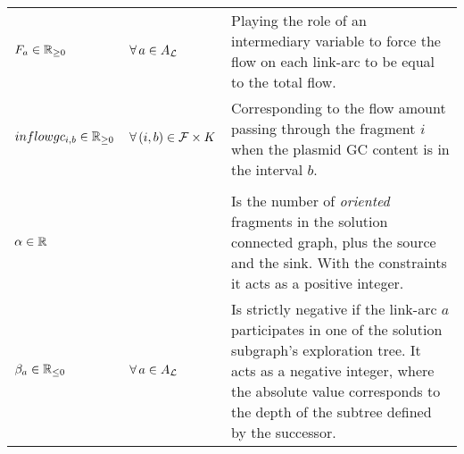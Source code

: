 \begin{table}
\begin{longtable}{@{}llp{}@{}}
    \addlinespace
    \(F_a \in \mathbb{R}_{\geq 0}\) & \(\forall a \in A_\Links{}\) & Playing the role of an intermediary variable to force the flow on each link-arc to be equal to the total flow. \\
    \addlinespace
    \(inflowgc_{i, b} \in \mathbb{R}_{\geq 0}\) & \(\forall (i, b) \in \Fragments{} \times K\) & Corresponding to the flow amount passing through the fragment \(i\) when the plasmid GC content is in the interval \(b\). \\
    \addlinespace
    \multicolumn{3}{@{}l@{}}{\tabhtxt{Connected component variables}} \\
    \addlinespace
    \(\alpha \in \mathbb{R}{}\) & & Is the number of \emph{oriented} fragments in the solution connected graph, plus the source and the sink. With the constraints it acts as a positive integer. \\
    \addlinespace
    \(\beta_a \in \mathbb{R}_{\leq 0}\) & \(\forall a \in A_\Links{}\) & Is strictly negative if the link-arc \(a\) participates in one of the solution subgraph's exploration tree. It acts as a negative integer, where the absolute value corresponds to the depth of the subtree defined by the successor. \\
    \bottomrule
  \end{longtable}
\end{table}
